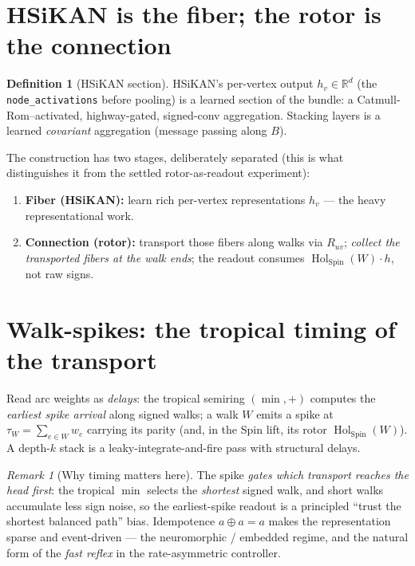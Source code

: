 \documentclass[11pt]{article}
\theoremstyle{definition}
\newtheorem{definition}{Definition}
\theoremstyle{plain}
\theoremstyle{remark}
\newtheorem{remark}{Remark}
\newcommand{\Hol}{\operatorname{Hol}}
\newcommand{\Spin}{\mathrm{Spin}}
\newcommand{\R}{\mathbb{R}}
\begin{document}
\section{HSiKAN is the fiber; the rotor is the connection}
\begin{definition}[HSiKAN section]
HSiKAN's per-vertex output $h_v\in\R^{d}$ (the \texttt{node\_activations} before pooling) is a learned section of
the bundle: a Catmull-Rom--activated, highway-gated, signed-conv aggregation. Stacking layers is a learned
\emph{covariant} aggregation (message passing along $B$).
\end{definition}
The construction has two stages, deliberately separated (this is what distinguishes it from the settled
rotor-as-readout experiment):
\begin{enumerate}[nosep,leftmargin=1.4em]
  \item \textbf{Fiber (HSiKAN):} learn rich per-vertex representations $h_v$ --- the heavy representational work.
  \item \textbf{Connection (rotor):} transport those fibers along walks via $R_{uv}$; \emph{collect the
        transported fibers at the walk ends}; the readout consumes $\Hol_{\Spin}(W)\!\cdot\!h$, not raw signs.
\end{enumerate}

\section{Walk-spikes: the tropical timing of the transport}
Read arc weights as \emph{delays}: the tropical semiring $(\min,+)$ computes the \emph{earliest spike arrival}
along signed walks; a walk $W$ emits a spike at $\tau_W=\sum_{e\in W}w_e$ carrying its parity (and, in the Spin
lift, its rotor $\Hol_{\Spin}(W)$). A depth-$k$ stack is a leaky-integrate-and-fire pass with structural delays.
\begin{remark}[Why timing matters here]
The spike \emph{gates which transport reaches the head first}: the tropical $\min$ selects the \emph{shortest}
signed walk, and short walks accumulate less sign noise, so the earliest-spike readout is a principled
``trust the shortest balanced path'' bias. Idempotence $a\oplus a=a$ makes the representation sparse and
event-driven --- the neuromorphic / embedded regime, and the natural form of the \emph{fast reflex} in the
rate-asymmetric controller.
\end{remark}
\end{document}
